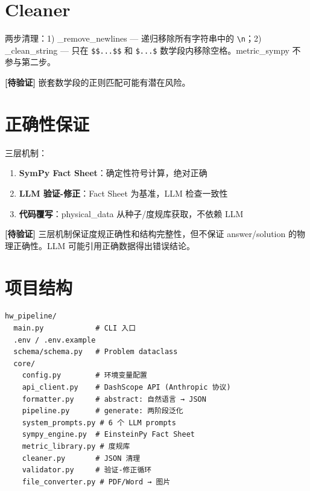 \documentclass[12pt,a4paper]{article}
\newcommand{\uncertain}[1]{{\color{uncertcolor}\textbf{[待验证]}} #1}
\begin{document}
\section{Cleaner}

两步清理：1) \_remove\_newlines — 递归移除所有字符串中的 \lstinline|\n|；2) \_clean\_string — 只在 \lstinline|$$...$$| 和 \lstinline|$...$| 数学段内移除空格。metric\_sympy 不参与第二步。

\uncertain{嵌套数学段的正则匹配可能有潜在风险。}

\section{正确性保证}

三层机制：

\begin{enumerate}
    \item \textbf{SymPy Fact Sheet}：确定性符号计算，绝对正确
    \item \textbf{LLM 验证-修正}：Fact Sheet 为基准，LLM 检查一致性
    \item \textbf{代码覆写}：physical\_data 从种子/度规库获取，不依赖 LLM
\end{enumerate}

\uncertain{三层机制保证度规正确性和结构完整性，但不保证 answer/solution 的物理正确性。LLM 可能引用正确数据得出错误结论。}

\section{项目结构}

\begin{lstlisting}[basicstyle=\ttfamily\footnotesize]
hw_pipeline/
  main.py            # CLI 入口
  .env / .env.example
  schema/schema.py   # Problem dataclass
  core/
    config.py        # 环境变量配置
    api_client.py    # DashScope API (Anthropic 协议)
    formatter.py     # abstract: 自然语言 → JSON
    pipeline.py      # generate: 两阶段泛化
    system_prompts.py # 6 个 LLM prompts
    sympy_engine.py  # EinsteinPy Fact Sheet
    metric_library.py # 度规库
    cleaner.py       # JSON 清理
    validator.py     # 验证-修正循环
    file_converter.py # PDF/Word → 图片
\end{lstlisting}
\end{document}
